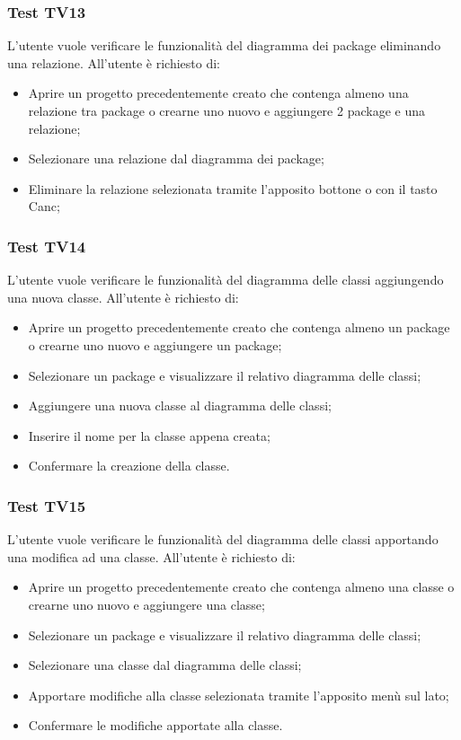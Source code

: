 \documentclass[../PianoDiQualifica.tex]{subfiles}
\begin{document}
	\subsubsection{Test TV13} 
	L'utente vuole verificare le funzionalità del diagramma dei package eliminando una relazione. 
	All'utente è richiesto di: 
	\begin{itemize} 
		\item Aprire un progetto precedentemente creato che contenga almeno una relazione tra package o crearne uno nuovo e aggiungere 2 package e una relazione; 
		\item Selezionare una relazione dal diagramma dei package; 
		\item Eliminare la relazione selezionata tramite l'apposito bottone o con il tasto Canc; 
	\end{itemize} 
	
	
	\subsubsection{Test TV14} 
	L'utente vuole verificare le funzionalità del diagramma delle classi aggiungendo una nuova classe. 
	All'utente è richiesto di: 
	\begin{itemize} 
		\item Aprire un progetto precedentemente creato che contenga almeno un package o crearne uno nuovo e aggiungere un package;
		\item Selezionare un package e visualizzare il relativo diagramma delle classi; 
		\item Aggiungere una nuova classe al diagramma delle classi; 
		\item Inserire il nome per la classe appena creata; 
		\item Confermare la creazione della classe. 
	\end{itemize} 
	
	\subsubsection{Test TV15} 
	L'utente vuole verificare le funzionalità del diagramma delle classi apportando una modifica ad una classe. 
	All'utente è richiesto di: 
	\begin{itemize} 
		\item Aprire un progetto precedentemente creato che contenga almeno una classe o crearne uno nuovo e aggiungere una classe;
		\item Selezionare un package e visualizzare il relativo diagramma delle classi; 
		\item Selezionare una classe dal diagramma delle classi; 
		\item Apportare modifiche alla classe selezionata tramite l'apposito menù sul lato; 
		\item Confermare le modifiche apportate alla classe. 
	\end{itemize} 
	
\end{document}
